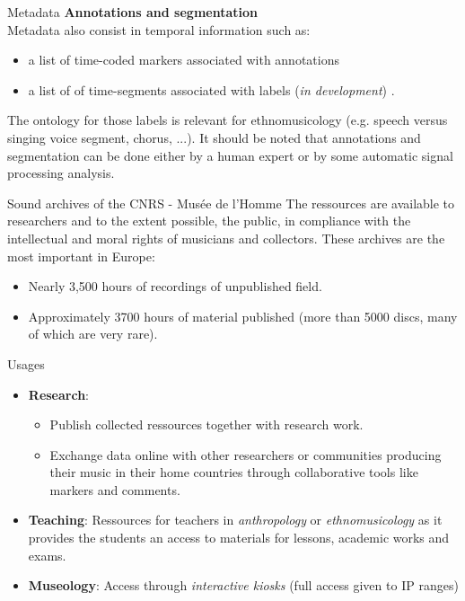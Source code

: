 \documentclass[final, hyperref, table]{beamer}
\begin{document}
\begin{frame}[containsverbatim]{}
\begin{columns}[T]
\begin{column}[T]{.49\linewidth}
\begin{block}{Metadata}
        \textbf{Annotations and segmentation}\\
        Metadata also consist in temporal information such as:
        \begin{itemize}
        \item a list of \alert{time-coded markers} associated with annotations
        \item a list of of \alert{time-segments} associated with labels (\emph{in development}) .
        \end{itemize}
        The ontology for those labels is relevant for ethnomusicology (e.g. speech versus singing voice segment, chorus, ...).
        It should be noted that annotations and segmentation can be done either by a human expert or by some automatic signal processing analysis.
      \end{block}
      
      \begin{block}{Sound archives of the CNRS - Musée de l'Homme}
        The ressources are available to researchers and to the extent possible, the public, in compliance with the intellectual and moral rights of musicians and collectors.
            These archives are the most important in Europe:
            \begin{itemize}
            \item Nearly 3,500 hours of recordings of unpublished field.
            \item Approximately 3700 hours of material published (more than
              5000 discs, many of which are very rare).
            \end{itemize}
            \begin{beamerboxesrounded}%
       [shadow=true]%
       {Usages}
       \begin{itemize}
       \item \textbf{Research}:
         \begin{itemize}\footnotesize

         \item \alert{Publish} collected ressources together with research
           work.
         \item \alert{Exchange} data online with other researchers or
           communities producing their music in their home countries
           through collaborative tools like markers and comments.
         \end{itemize}
       \item \textbf{Teaching}: Ressources for teachers in \emph{anthropology} or
         \emph{ethnomusicology} as it provides the students an access to
         materials for lessons, academic works and exams.
       \item \textbf{Museology}: Access through \emph{interactive kiosks} (full
         access given to IP ranges)
       \end{itemize}


\end{beamerboxesrounded}
\end{block}
\end{column}
\end{columns}
\end{frame}
\end{document}
